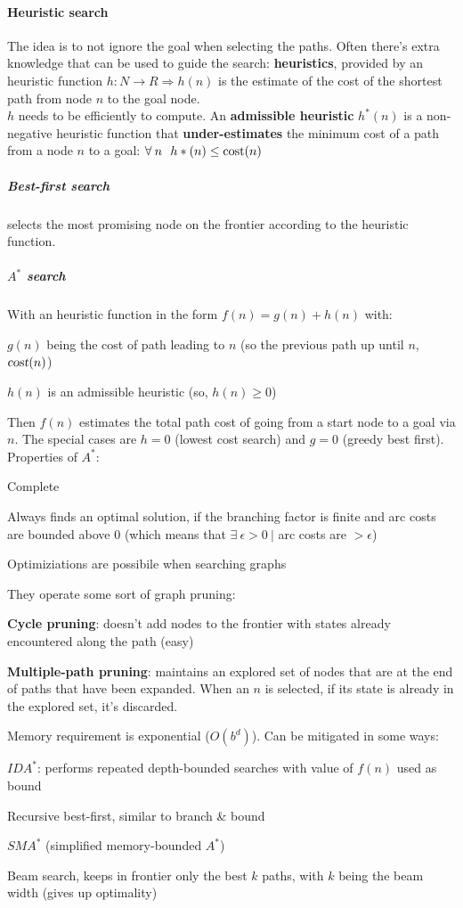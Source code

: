 \documentclass[10pt]{report}
\begin{document}
\paragraph{Heuristic search} The idea is to not ignore the goal when selecting the paths. Often there's extra knowledge that can be used to guide the search: \textbf{heuristics}, provided by an heuristic function $h:N\rightarrow R \Rightarrow h(n)$ is the estimate of the cost of the shortest path from node $n$ to the goal node.\\
$h$ needs to be efficiently to compute. An \textbf{admissible heuristic} $h^*(n)$ is a non-negative heuristic function that \textbf{under-estimates} the minimum cost of a path from a node $n$ to a goal: $\forall\:n\:\:\:h*(n) \leq \hbox{cost}(n)$
\subparagraph{Best-first search} selects the most promising node on the frontier according to the heuristic function.
\subparagraph{$A^*$ search} With an heuristic function in the form $f(n) = g(n) + h(n)$ with:
\begin{list}{}{}
	\item $g(n)$ being the cost of path leading to $n$ (so the previous path up until $n$, $\textsl{cost}(n)$)
	\item $h(n)$ is an admissible heuristic (so, $h(n) \geq 0$)
\end{list}
Then $f(n)$ estimates the total path cost of going from a start node to a goal via $n$. The special cases are $h = 0$ (lowest cost search) and $g = 0$ (greedy best first).\\
Properties of $A^*$:\begin{list}{}{}
	\item Complete
	\item Always finds an optimal solution, if the branching factor is finite and arc costs are bounded above 0 (which means that $\exists\:\epsilon > 0\:|$ arc costs are $> \epsilon$)
	\item Optimiziations are possibile when searching graphs
	\item They operate some sort of graph pruning:
	\begin{list}{}{}
		\item \textbf{Cycle pruning}: doesn't add nodes to the frontier with states already encountered along the path (easy)
		\item \textbf{Multiple-path pruning}: maintains an explored set of nodes that are at the end of paths that have been expanded. When an $n$ is selected, if its state is already in the explored set, it's discarded.
	\end{list}
	\item Memory requirement is exponential ($O(b^d)$). Can be mitigated in some ways:
	\begin{list}{}{}
		\item $IDA^*$: performs repeated depth-bounded searches with value of $f(n)$ used as bound
		\item Recursive best-first, similar to branch \& bound
		\item $SMA^*$ (simplified memory-bounded $A^*$)
		\item Beam search, keeps in frontier only the best $k$ paths, with $k$ being the beam width (gives up optimality)
	\end{list}
\end{list}
\end{document}
